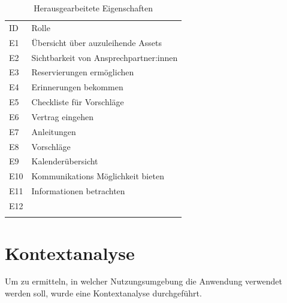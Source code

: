 \begin{table}[h]
        \centering
        \caption{Herausgearbeitete Eigenschaften}
        \begin{tabular}{ll}
                \arrayrulecolor{maincolor}\hline
                \sffamily\color{maincolor}ID & \sffamily\color{maincolor}Rolle \\
                \arrayrulecolor{maincolor}\hline
                E1                           & Übersicht über auzuleihende Assets
                \\
                E2                           & Sichtbarkeit von Ansprechpartner:innen
                \\
                E3                           & Reservierungen ermöglichen        \\
                E4                           & Erinnerungen bekommen             \\
                E5                           & Checkliste für Vorschläge         \\
                E6                           & Vertrag eingehen                  \\
                E7                           & Anleitungen                       \\
                E8                           & Vorschläge                        \\
                E9                           & Kalenderübersicht                 \\
                E10                          & Kommunikations Möglichkeit bieten \\
                E11                          & Informationen betrachten          \\
                E12                          &                                   \\
                \arrayrulecolor{maincolor}\hline
        \end{tabular}
        \label{table:e}
        \hfill
\end{table}




\section{Kontextanalyse}
\label{section:kontext}

Um zu ermitteln, in welcher Nutzungsumgebung die Anwendung verwendet werden soll, wurde eine
Kontextanalyse durchgeführt.

